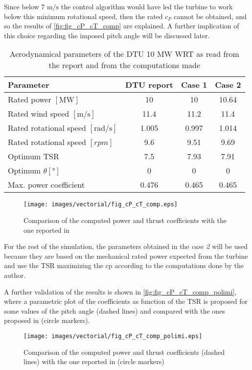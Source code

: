 Since below 7 $\si{\meter\per\second}$ the control algorithm would have led the turbine to work below this minimum rotational speed, then the rated $c_P$ cannot be obtained, and so the results of \autoref{fig:fig_cP_cT_comp} are explained. A further implication of this choice regarding the imposed pitch angle will be discussed later.

\begin{table}[htb]
    \caption{Aerodynamical parameters of the DTU 10 MW \acrshort{WRT} as read from the report and from the computations made}
    \centering
    \begin{tabular}{lccc}
    \toprule
    Parameter & DTU report & Case 1 & Case 2\\ \midrule
    Rated power $\left[\si{\mega \watt}\right]$ & 10 & 10 & 10.64  \\
    Rated wind speed $\left[\si{\meter \per \second}\right]$ & 11.4 & 11.2 & 11.4 \\
    Rated rotational speed $\left[\si{\radian \per \second}\right]$ & 1.005 & 0.997 & 1.014 \\
    Rated rotational speed $\left[rpm\right]$ & 9.6 & 9.51 & 9.69\\
    Optimum \acrshort{TSR} & 7.5 & 7.93 & 7.91\\
    Optimum $\theta \left[\si{\degree}\right]$ & 0 & 0 & 0 \\
    Max. power coefficient & 0.476 & 0.465 & 0.465 \\
    \bottomrule
    \end{tabular}
    \label{tab:DTU_10_aero}
\end{table}

\begin{figure}[htb]
    \centering
    \texttt{[image: images/vectorial/fig\_cP\_cT\_comp.eps]}
    \caption{Comparison of the computed power and thrust coefficients with the one reported in \cite{DTU_Wind_Energy_Report-I-0092}}
    \label{fig:fig_cP_cT_comp}
\end{figure}
For the rest of the simulation, the parameters obtained in the \textit{case 2} will be used because they are based on the mechanical rated power expected from the turbine and use the \acrshort{TSR} maximizing the \acrshort{cp} according to the computations done by the author.

A further validation of the results is shown in \autoref{fig:fig_cP_cT_comp_polimi}, where a parametric plot of the coefficients as function of the \acrshort{TSR} is proposed for some values of the pitch angle (dashed lines) and compared with the ones proposed in  \cite{Variable-speed_Variable-pitch_control_for_a_wind_t} (circle markers).
\begin{figure}[htb]
    \centering
    \texttt{[image: images/vectorial/fig\_cP\_cT\_comp\_polimi.eps]}
    \caption{Comparison of the computed power and thrust coefficients (dashed lines) with the one reported in \cite{Variable-speed_Variable-pitch_control_for_a_wind_t} (circle markers)}
    \label{fig:fig_cP_cT_comp_polimi}
\end{figure}

